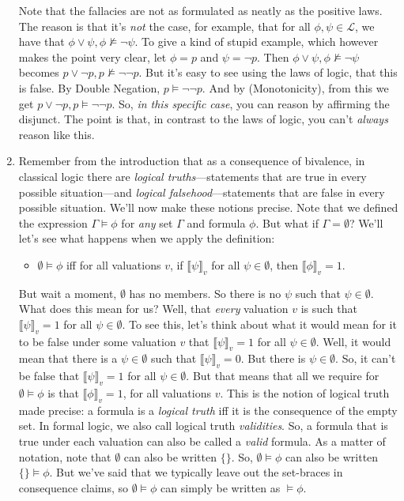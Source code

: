 \begin{enumerate}[\thesection.1]
	Note that the fallacies are not as formulated as neatly as the positive laws. The reason is that it's \emph{not} the case, for example, that for all $\phi,\psi\in\mathcal{L}$, we have that $\phi\lor\psi,\phi\nvDash\neg\psi$. To give a kind of stupid example, which however makes the point very clear, let $\phi=p$ and $\psi=\neg p$. Then $\phi\lor\psi,\phi\nvDash\neg\psi$ becomes $p\lor\neg p, p\nvDash \neg\neg p$. But it's easy to see using the laws of logic, that this is false. By Double Negation, $p\vDash \neg\neg p$. And by (Monotonicity), from this we get $p\lor\neg p, p\vDash \neg\neg p$. So, \emph{in this specific case}, you can reason by affirming the disjunct. The point is that, in contrast to the laws of logic, you can't \emph{always} reason like this. 
	
	\item Remember from the introduction that as a consequence of bivalence, in classical logic there are \emph{logical truths}---statements that are true in every possible situation---and \emph{logical falsehood}---statements that are false in every possible situation. We'll now make these notions precise. Note that we defined the expression $\Gamma\vDash \phi$ for \emph{any} set $\Gamma$ and formula $\phi$. But what if $\Gamma=\emptyset$? We'll let's see what happens when we apply the definition:
	\begin{itemize}
	
		\item $\emptyset\vDash\phi$ iff for all valuations $v$, if $\llbracket\psi\rrbracket_v$ for all $\psi\in\emptyset$, then $\llbracket\phi\rrbracket_v=1$. 
	
	\end{itemize}
But wait a moment, $\emptyset$ has no members. So there is no $\psi$ such that $\psi\in \emptyset$. What does this mean for us? Well, that \emph{every} valuation $v$ is such that $\llbracket\psi\rrbracket_v=1$ for all $\psi\in\emptyset$. To see this, let's think about what it would mean for it to be false under some valuation $v$ that $\llbracket\psi\rrbracket_v=1$ for all $\psi\in\emptyset$. Well, it would mean that there is a $\psi\in\emptyset$ such that $\llbracket\psi\rrbracket_v=0$. But there is $\psi\in\emptyset$. So, it can't be false that $\llbracket\psi\rrbracket_v=1$ for all $\psi\in\emptyset$. But that means that all we require for $\emptyset\vDash\phi$ is that $\llbracket\phi\rrbracket_v=1$, for all valuations $v$. This is the notion of logical truth made precise: a formula is a \emph{logical truth} iff it is the consequence of the empty set. In formal logic, we also call logical truth \emph{validities}. So, a formula that is true under each valuation can also be called a \emph{valid} formula. As a matter of notation, note that $\emptyset$ can also be written $\{\}$. So, $\emptyset\vDash\phi$ can also be written $\{\}\vDash\phi$. But we've said that we typically leave out the set-braces in consequence claims, so $\emptyset\vDash\phi$ can simply be written as $\vDash\phi$.


\end{enumerate}
